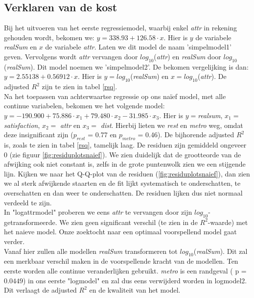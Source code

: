 \documentclass[a4paper]{kulakarticle}
\begin{document}
	\subsection{Verklaren van de kost}
	
	Bij het uitvoeren van het eerste regressiemodel, waarbij enkel \textit{attr} in rekening gehouden wordt, bekomen we: 
    $ y = 338.93 + 126.58\cdot x$. Hier is $y$ de variabele \textit{realSum} en $x$ de variabele \textit{attr}. Laten we dit model de naam 'simpelmodel1' geven. Vervolgens wordt \textit{attr} vervangen door $log_{10}$(\textit{attr}) en \textit{realSum} door $log_{10}$(\textit{realSum}). Dit model noemen we 'simpelmodel2'. De bekomen vergelijking is dan: $ y = 2.55138 + 0.56912\cdot x$. Hier is $y = log_{10}$(\textit{realSum}) en $x = log_{10}$(\textit{attr}). De adjusted $R^2$ zijn te zien in tabel \ref{rsq}.\\
	Na het toepassen van achterwaartse regressie op ons naïef model, met alle continue variabelen, bekomen we het volgende model: $y = -190.900 + 75.886\cdot x_1 + 79.480\cdot x_2 -31.985\cdot x_3$. Hier is $y =$\textit{realsum}, $x_1 = $ \textit{satisfaction}, $x_2 =$ \textit{attr} en $x_3 =$ \textit{dist}. Hierbij lieten we \textit{rest} en \textit{metro} weg, omdat deze insignificant zijn ($p_{rest}$ = 0.77 en $p_{metro}$ = 0.46). De bijhorende adjusted $R^2$ is, zoals te zien in tabel \ref{rsq}, tamelijk laag. De residuen zijn gemiddeld ongeveer 0 (zie figuur \ref{fig:residuplotsnaief}). We zien duidelijk dat de grootteorde van de afwijking ook niet constant is, zelfs in de grote puntenwolk zien we een stijgende lijn. Kijken we naar het Q-Q-plot van de residuen (\ref{fig:residuplotsnaief}), dan zien we al sterk afwijkende staarten en de fit lijkt systematisch te onderschatten, te overschatten en dan weer te onderschatten. De residuen lijken dus niet normaal verdeeld te zijn. \\
	
	In "logattrmodel" proberen we eens \textit{attr} te vervangen door zijn $log_{10}$-getransformeerde. We zien geen significant verschil (te zien in de $R^2$-waarde) met het naieve model. Onze zoektocht naar een optimaal voorspellend model gaat verder. \\
	Vanaf hier zullen alle modellen \textit{realSum} transformeren tot $log_{10}$(\textit{realSum}). Dit zal een merkbaar verschil maken in de voorspellende kracht van de modellen. Ten eerste worden alle continue veranderlijken gebruikt. \textit{metro} is een randgeval ( p = $0.0449$) in ons eerste "logmodel" en zal dus eens verwijderd worden in logmodel2. Dit verlaagt de adjusted $R^2$ en de kwaliteit van het model. \\
	
\end{document}
